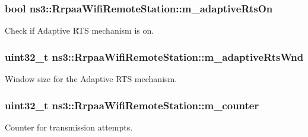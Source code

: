 \subsubsection[{\texorpdfstring{m\+\_\+adaptive\+Rts\+On}{m_adaptiveRtsOn}}]{\setlength{\rightskip}{0pt plus 5cm}bool ns3\+::\+Rrpaa\+Wifi\+Remote\+Station\+::m\+\_\+adaptive\+Rts\+On}\hypertarget{structns3_1_1RrpaaWifiRemoteStation_aadd0a82c0315fef3f1ae567bed1612c2}{}\label{structns3_1_1RrpaaWifiRemoteStation_aadd0a82c0315fef3f1ae567bed1612c2}


Check if Adaptive R\+TS mechanism is on. 

\subsubsection[{\texorpdfstring{m\+\_\+adaptive\+Rts\+Wnd}{m_adaptiveRtsWnd}}]{\setlength{\rightskip}{0pt plus 5cm}uint32\+\_\+t ns3\+::\+Rrpaa\+Wifi\+Remote\+Station\+::m\+\_\+adaptive\+Rts\+Wnd}\hypertarget{structns3_1_1RrpaaWifiRemoteStation_ae7565892bf6ab87348e2247c744254be}{}\label{structns3_1_1RrpaaWifiRemoteStation_ae7565892bf6ab87348e2247c744254be}


Window size for the Adaptive R\+TS mechanism. 

\subsubsection[{\texorpdfstring{m\+\_\+counter}{m_counter}}]{\setlength{\rightskip}{0pt plus 5cm}uint32\+\_\+t ns3\+::\+Rrpaa\+Wifi\+Remote\+Station\+::m\+\_\+counter}\hypertarget{structns3_1_1RrpaaWifiRemoteStation_a286b2167b4aa5b50156cb430bf6f7fe8}{}\label{structns3_1_1RrpaaWifiRemoteStation_a286b2167b4aa5b50156cb430bf6f7fe8}


Counter for transmission attempts. 

